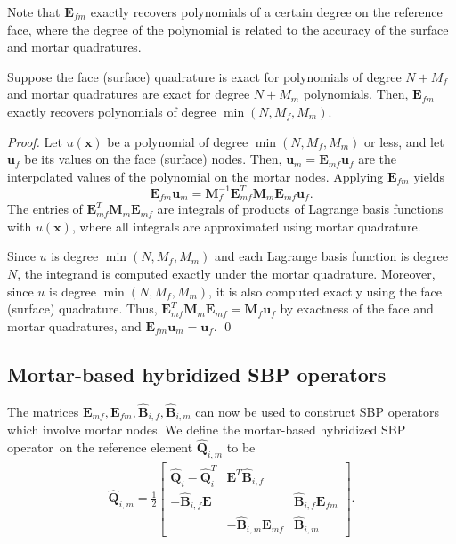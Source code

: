 \documentclass{svjour3}                     %
\renewcommand{\hat}{\widehat}
\begin{document}
Note that $\bm{E}_{fm}$ exactly recovers polynomials of a certain degree on the reference face, where the degree of the polynomial is related to the accuracy of the surface and mortar quadratures.
\begin{lemma}
\label{lemma:Efm}
Suppose the face (surface) quadrature is exact for polynomials of degree $N+M_f$ and mortar quadratures are exact for degree $N+M_m$ polynomials.  Then, $\bm{E}_{fm}$ exactly recovers polynomials of degree $\min(N,M_f,M_m)$.
\end{lemma}
\begin{proof}
Let $u(\bm{x})$ be a polynomial of degree $\min(N,M_f,M_m)$ or less, and let $\bm{u}_f$ be its values on the face (surface) nodes.  Then, $\bm{u}_m = \bm{E}_{mf}\bm{u}_f$ are the interpolated values of the polynomial on the mortar nodes.  Applying $\bm{E}_{fm}$ yields
\[
\bm{E}_{fm}\bm{u}_m = \bm{M}_f^{-1}\bm{E}_{mf}^T\bm{M}_m\bm{E}_{mf}\bm{u}_f.
\]
The entries of $\bm{E}_{mf}^T\bm{M}_m\bm{E}_{mf}$ are integrals of products of Lagrange basis functions with $u(\bm{x})$, where all integrals are approximated using mortar quadrature.  

Since $u$ is degree $\min(N,M_f,M_m)$ and each Lagrange basis function is degree $N$, the integrand is computed exactly under the mortar quadrature.  Moreover, since $u$ is degree $\min(N,M_f,M_m)$, it is also computed exactly using the face (surface) quadrature.  Thus, $\bm{E}_{mf}^T\bm{M}_m\bm{E}_{mf} = \bm{M}_f \bm{u}_f$ by exactness of the face and mortar quadratures, and $\bm{E}_{fm}\bm{u}_m = \bm{u}_f$.
\qed\end{proof}

\subsection{Mortar-based hybridized SBP operators}

The matrices $\bm{E}_{mf}, \bm{E}_{fm}, \hat{\bm{B}}_{i,f}, \hat{\bm{B}}_{i,m}$ can now be used to construct SBP operators which involve mortar nodes.  We define the mortar-based hybridized SBP operator on the reference element $\hat{\bm{Q}}_{i,m}$ to be
\begin{align}
\hat{\bm{Q}}_{i,m} = \frac{1}{2}\begin{bmatrix}
\hat{\bm{Q}}_i - \hat{\bm{Q}}_i^T & \bm{E}^T\hat{\bm{B}}_{i,f} & \\
-\hat{\bm{B}}_{i,f}\bm{E} & & \hat{\bm{B}}_{i,f} \bm{E}_{fm}\\
& -\hat{\bm{B}}_{i,m} \bm{E}_{mf} & \hat{\bm{B}}_{i,m}
\end{bmatrix}.
\label{eq:mhsbp}
\end{align}
\end{document}
